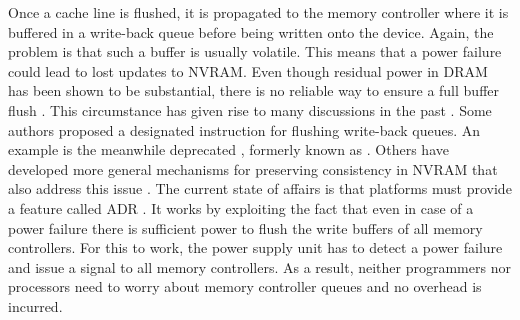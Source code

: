 Once a cache line is flushed, it is propagated to the memory controller where it
is buffered in a write-back queue before being written onto the device. Again,
the problem is that such a buffer is usually volatile. This means that a power
failure could lead to lost updates to \ac{NVRAM}. Even though residual power in
\ac{DRAM} has been shown to be substantial, there is no reliable way to ensure a
full buffer flush \cite{halderman2008lest}. This circumstance has given rise to
many discussions in the past \cite{condit2009better, dulloor2014system,
kolli2016high}. Some authors proposed a designated instruction for flushing
write-back queues. An example is the meanwhile deprecated ,
formerly known as  \cite{dulloor2014system, oukid2015instant,
schwalb2015nvm_malloc, volos2017whisper}. Others have developed more general
mechanisms for preserving consistency in \ac{NVRAM} that also address this issue
\cite{condit2009better, pelley2014memory}. The current state of affairs is that
platforms must provide a feature called \ac{ADR} \cite{volos2017whisper}. It
works by exploiting the fact that even in case of a power failure there is
sufficient power to flush the write buffers of all memory controllers. For this
to work, the power supply unit has to detect a power failure and issue a signal
to all memory controllers. As a result, neither programmers nor processors need
to worry about memory controller queues and no overhead is incurred.
